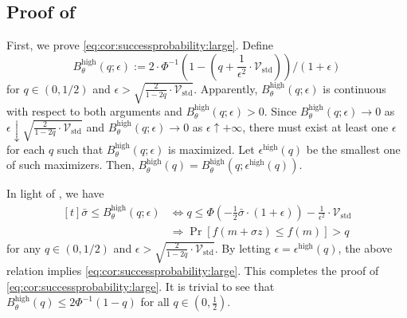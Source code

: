 \documentclass[journal]{IEEEtran}
\renewcommand{\leq}{\leqslant} %
\theoremstyle{definition}
\newcommand{\yohe}[1]{{\color{cyan}Y.A.: #1}}
\begin{document}
\subsection{Proof of }\label{apdx:cor:successprobability}


First, we prove \eqref{eq:cor:successprobability:large}.
Define 
\begin{equation}
B_\theta^\mathrm{high}(q; \epsilon) := 2\cdot\Phi^{-1} \left(1 - \left(q + \frac{1}{\epsilon^2} \cdot \mathcal{V}_\mathrm{std}\right) \right)/ (1 + \epsilon)
\label{eq:b_high_q_e}
\end{equation}
for $q\in(0, 1/2)$ and $\epsilon > \sqrt{\frac{2}{1-2q}\cdot\mathcal{V}_\mathrm{std}}$.
Apparently, $B_\theta^\mathrm{high}(q; \epsilon)$ is continuous with respect to both arguments and $B_\theta^\mathrm{high}(q; \epsilon) > 0$. 
Since $B_\theta^\mathrm{high}(q; \epsilon) \to 0$ as $\epsilon \downarrow \sqrt{\frac{2}{1-2q}\cdot\mathcal{V}_\mathrm{std}}$ and $B_\theta^\mathrm{high}(q; \epsilon) \to 0$ as $\epsilon \uparrow + \infty$, there must exist at least one $\epsilon$ for each $q$ such that $B_\theta^\mathrm{high}(q; \epsilon)$ is maximized. Let $\epsilon^\text{high}(q)$ be the smallest one of such maximizers. Then, $B_\theta^\text{high}(q) = B_\theta^\text{high}(q; \epsilon^\text{high}(q))$.

In light of , we have
\begin{equation}
\begin{aligned}[t]
\bar\sigma \leq  B_\theta^\mathrm{high}(q; \epsilon)
&\Leftrightarrow 
q\leq \Phi\left(-\frac12 \bar\sigma\cdot (1+\epsilon)\right) - \frac{1}{\epsilon^2}\cdot\mathcal{V}_\mathrm{std}
\\
&\Rightarrow
\Pr\left[f(m+\sigma z)\leq f(m)\right] > q
\end{aligned}
\end{equation}
for any $q\in(0, 1/2)$ and $\epsilon > \sqrt{\frac{2}{1-2q}\cdot\mathcal{V}_\mathrm{std}}$.
By letting $\epsilon = \epsilon^\text{high}(q)$, the above relation implies \eqref{eq:cor:successprobability:large}. This completes the proof of \eqref{eq:cor:successprobability:large}.
It is trivial to see that $B_\theta^\mathrm{high}(q) \leq 2 \Phi^{-1}(1-q)$ for all $q \in \left(0, \frac12\right)$.
\end{document}
